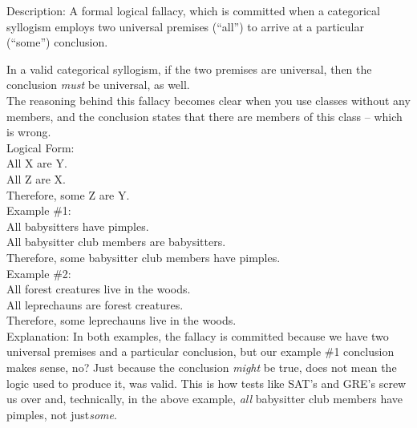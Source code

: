 \documentclass[a4paper,12pt,single,pdftex]{scrartcl}
\begin{document}
    Description: A formal logical fallacy, which is committed when a categorical syllogism employs two universal premises (“all”) to arrive at a particular (“some”) conclusion.

    
      In a valid categorical syllogism, if the two premises are universal, then the conclusion {\it must} be universal, as well.
    \\

    
      The reasoning behind this fallacy becomes clear when you use classes without any members, and the conclusion states that there are members of this class -- which is wrong.
    \\

    
      Logical Form:
    \\

    
      All X are Y.
    \\

    
      All Z are X.
    \\

    
      Therefore, some Z are Y.
    \\

    
      Example \#1: 
    \\

    
      All babysitters have pimples.
    \\

    
      All babysitter club members are babysitters.
    \\

    
      Therefore, some babysitter club members have pimples.
    \\

    
      Example \#2: 
    \\

    
      All forest creatures live in the woods.
    \\

    
      All leprechauns are forest creatures.
    \\

    
      Therefore, some leprechauns live in the woods.
    \\

    
      Explanation: In both examples, the fallacy is committed because we have two universal premises and a particular conclusion, but our example \#1 conclusion makes sense, no?  Just because the conclusion {\it might}  be true, does not mean the logic used to produce it, was valid.  This is how tests like SAT’s and GRE’s screw us over and, technically, in the above example, {\it all} babysitter club members have pimples, not just{\it   some}.
    \\
\end{document}
